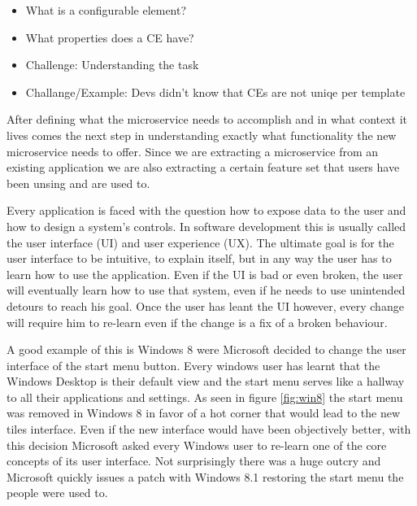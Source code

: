 \begin{itemize}
  \item What is a configurable element?
  \item What properties does a CE have?
  \item Challenge: Understanding the task
  \item Challange/Example: Devs didn't know that CEs are not uniqe per template
\end{itemize}

After defining what the microservice needs to accomplish and in what context it lives comes the next step in understanding exactly what functionality the new microservice needs to offer. Since we are extracting a microservice from an existing application we are also extracting a certain feature set that users have been unsing and are used to.

Every application is faced with the question how to expose data to the user and how to design a system's controls. In software development this is usually called the user interface (UI) and user experience (UX). The ultimate goal is for the user interface to be intuitive, to explain itself, but in any way the user has to learn how to use the application. Even if the UI is bad or even broken, the user will eventually learn how to use that system, even if he needs to use unintended detours to reach his goal. Once the user has leant the UI however, every change will require him to re-learn even if the change is a fix of a broken behaviour.

A good example of this is Windows 8 were Microsoft decided to change the user interface of the start menu button. Every windows user has learnt that the Windows Desktop is their default view and the start menu serves like a hallway to all their applications and settings. As seen in figure \ref{fig:win8} the start menu was removed in Windows 8 in favor of a hot corner that would lead to the new tiles interface. Even if the new interface would have been objectively better, with this decision Microsoft asked every Windows user to re-learn one of the core concepts of its user interface. Not surprisingly there was a huge outcry and Microsoft quickly issues a patch with Windows 8.1 restoring the start menu the people were used to.

